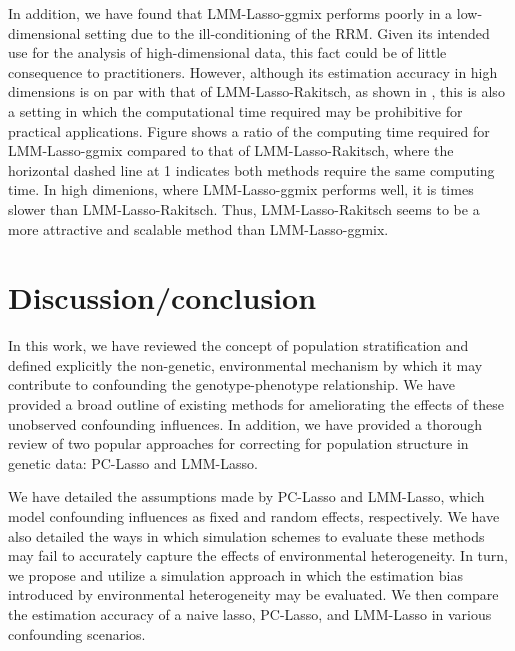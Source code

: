 In addition, we have found that LMM-Lasso-ggmix performs poorly in a low-dimensional setting due to the ill-conditioning of the RRM. Given its intended use for the analysis of high-dimensional data, this fact could be of little consequence to practitioners. However, although its estimation accuracy in high dimensions is on par with that of LMM-Lasso-Rakitsch, as shown in , this is also a setting in which the computational time required may be prohibitive for practical applications. Figure  shows a ratio of the computing time required for LMM-Lasso-ggmix compared to that of LMM-Lasso-Rakitsch, where the horizontal dashed line at 1 indicates both methods require the same computing time. In high dimenions, where LMM-Lasso-ggmix performs well, it is  times slower than LMM-Lasso-Rakitsch. Thus, LMM-Lasso-Rakitsch seems to be a more attractive and scalable method than LMM-Lasso-ggmix.


\section{Discussion/conclusion}
In this work, we have reviewed the concept of population stratification and defined explicitly the non-genetic, environmental mechanism by which it may contribute to confounding the genotype-phenotype relationship. We have provided a broad outline of existing methods for ameliorating the effects of these unobserved confounding influences. In addition, we have provided a thorough review of two popular approaches for correcting for population structure in genetic data: PC-Lasso and LMM-Lasso. 

We have detailed the assumptions made by PC-Lasso and LMM-Lasso, which model confounding influences as fixed and random effects, respectively. We have also detailed the ways in which simulation schemes to evaluate these methods may fail to accurately capture the effects of environmental heterogeneity. In turn, we propose and utilize a simulation approach in which the estimation bias introduced by environmental heterogeneity may be evaluated. We then compare the estimation accuracy of a naive lasso, PC-Lasso, and LMM-Lasso in various confounding scenarios.

